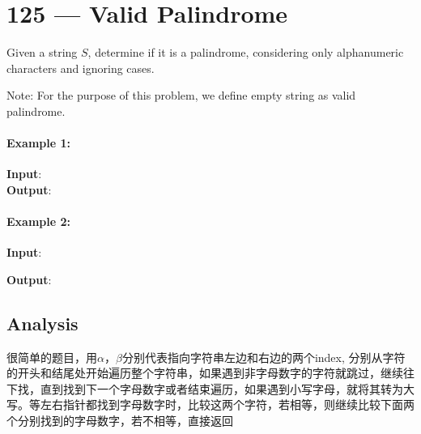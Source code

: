 \section{125 --- Valid Palindrome}
Given a string $S$, determine if it is a palindrome, considering only alphanumeric characters and ignoring cases.
\par
Note: For the purpose of this problem, we define empty string as valid palindrome.
\paragraph{Example 1:}
\begin{flushleft}
\textbf{Input}: 
\\
\textbf{Output}: 
\end{flushleft}
\paragraph{Example 2:}
\begin{flushleft}
\textbf{Input}: 

\textbf{Output}: 
\end{flushleft}
\subsection{Analysis}
很简单的题目，用$\alpha$，$\beta$分别代表指向字符串左边和右边的两个index, 分别从字符的开头和结尾处开始遍历整个字符串，如果遇到非字母数字的字符就跳过，继续往下找，直到找到下一个字母数字或者结束遍历，如果遇到小写字母，就将其转为大写。等左右指针都找到字母数字时，比较这两个字符，若相等，则继续比较下面两个分别找到的字母数字，若不相等，直接返回